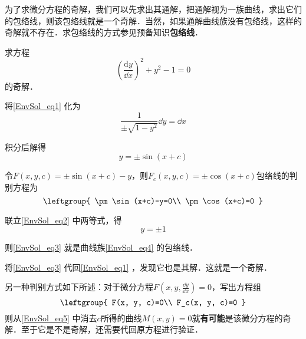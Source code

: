 为了求微分方程的奇解，我们可以先求出其通解，把通解视为一族曲线，求出它们的包络线，则该包络线就是一个奇解．当然，如果通解曲线族没有包络线，这样的奇解就不存在．求包络线的方式参见预备知识\textbf{包络线}．

\begin{example}{}
求方程
\begin{equation}\label{EnvSol_eq1}
(\frac{\mathrm{d} y}{\dd x})^2+y^2-1=0
\end{equation}
的奇解．

将\autoref{EnvSol_eq1} 化为
\begin{equation}
\frac{1}{\pm\sqrt{1-y^2}}\dd y=\dd x
\end{equation}

积分后解得
\begin{equation}\label{EnvSol_eq4}
y=\pm\sin(x+c)
\end{equation}

令$F(x, y, c)=\pm\sin(x+c)-y$，则$F_c(x, y, c)=\pm\cos(x+c)$包络线的判别方程为
\begin{equation}\label{EnvSol_eq2}
\leftgroup{
    \pm\sin(x+c)-y=0\\
    \pm\cos(x+c)=0
}
\end{equation}

联立\autoref{EnvSol_eq2} 中两等式，得
\begin{equation}\label{EnvSol_eq3}
y=\pm 1
\end{equation}

则\autoref{EnvSol_eq3} 就是曲线族\autoref{EnvSol_eq4} 的包络线．

将\autoref{EnvSol_eq3} 代回\autoref{EnvSol_eq1} ，发现它也是其解．这就是一个奇解．


\end{example}

另一种判别方式如下所述：对于微分方程$F(x, y, \frac{\dd y}{\dd x})=0$，写出方程组
\begin{equation}\label{EnvSol_eq5}
\leftgroup{
    F(x, y, c)=0\\
    F_c(x, y, c)=0
}
\end{equation}
则从\autoref{EnvSol_eq5} 中消去$c$所得的曲线$M(x, y)=0$就\textbf{有可能}是该微分方程的奇解．至于它是不是奇解，还需要代回原方程进行验证．


